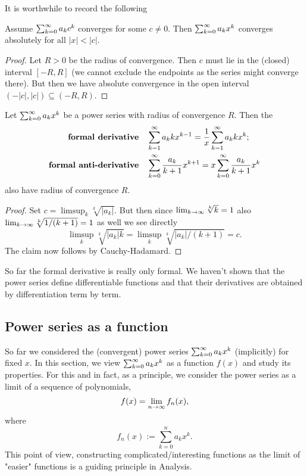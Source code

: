 \documentclass[10pt, a4paper]{article}
\newcommand{\infsumo}{\infsum[k = 0]}
\begin{document}
It is worthwhile to record the following
\begin{corollary}
    Assume $\infsumo a_kc ^ k$ converges for some $c \neq 0$.
    Then $\infsumo a_kx ^ k$ converges absolutely for all $|x| < |c|$.
    \begin{proof}
        Let $R > 0$ be the radius of convergence.
        Then $c$ must lie in the
        (closed)
        interval $[-R, R]$
        (we cannot exclude the endpoints as the series might converge there).
        But then we have absolute convergence in the open interval $(-|c|, |c|) \subseteq (-R, R)$.
    \end{proof}
\end{corollary}

\begin{lemma}\label{pre:analy:lem:powseriescalc}
    Let $\infsumo a_kx ^ k$ be a power series with radius of convergence $R$.
    Then the
    \begin{align*}
        \textbf{formal derivative}\quad&\infsum a_kkx ^ {k - 1} = \frac{1}{x}\infsum a_kk x ^ {k}; \\
        \textbf{formal anti-derivative}\quad&\infsumo\frac{a_k}{k + 1}x ^ {k + 1} = x\infsumo\frac{a_k}{k + 1}x ^ {k}
    \end{align*}
    also have radius of convergence $R$.
    \begin{proof}
        Set $c = \limsup_{k}\sqrt[k]{|a_k|}$.
        But then since $\liminfty[k]\sqrt[k]{k} = 1$ also $\liminfty[k]\sqrt[k]{1 / (k + 1)} = 1$ as well we see directly
        \[
        \limsup_{k}\sqrt[k]{|a_k|k} = \limsup_{k}\sqrt[k]{|a_k| / (k + 1)} = c.
        \]
        The claim now follows by Cauchy-Hadamard.
    \end{proof}
\end{lemma}

\begin{remark}
    So far the formal derivative is really only formal.
    We haven't shown that the power series define differentiable functions and that their derivatives are obtained by differentiation term by term.
\end{remark}

\subsection{Power series as a function}

So far we considered the
(convergent)
power series $\infsumo a_kx ^ k$
(implicitly)
for fixed $x$.
In this section,
we view $\infsumo a_kx ^ k$ as a function $f(x)$ and study its properties.
For this and in fact,
as a principle,
we consider the power series as a limit of a sequence of polynomials,
\[
f(x) = \liminfty f_n(x),
\]
where
\[
f_n(x) := \sum_{k = 0}^{n}a_kx ^ k.
\]
This point of view,
constructing complicated/interesting functions as the limit of "easier" functions is a guiding principle in Analysis.
\end{document}
